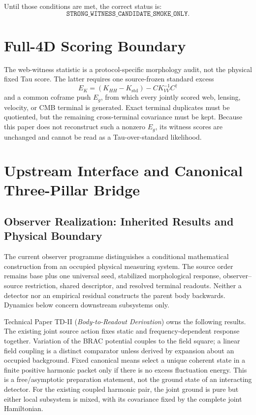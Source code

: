 \documentclass[11pt]{article}
\begin{document}
Until those conditions are met, the correct status is:
\[
\texttt{STRONG\_WITNESS\_CANDIDATE\_SMOKE\_ONLY}.
\]

\section{Full-4D Scoring Boundary}

The web-witness statistic is a protocol-specific morphology audit, not the
physical fixed Tau score.  The latter requires one source-frozen standard
excess
\[
 E_K=(K_{HH}-K_{\mathrm{std}})-CK_{VV}^{-1}C^\dagger
\]
and a common coframe push $E_g$, from which every jointly scored web,
lensing, velocity, or CMB terminal is generated.  Exact terminal duplicates
must be quotiented, but the remaining cross-terminal covariance must be kept.
Because this paper does not reconstruct such a nonzero $E_g$, its witness
scores are unchanged and cannot be read as a Tau-over-standard likelihood.

\section{Upstream Interface and Canonical Three-Pillar Bridge}
\label{sec:upstream-three-pillar-bridge}

\subsection{Observer Realization: Inherited Results and Physical Boundary}
\label{sec:observer-update-20260914}
The current observer programme distinguishes a conditional mathematical
construction from an occupied physical measuring system. The source order
remains base plus one universal seed, stabilized morphological response,
observer--source restriction, shared descriptor, and resolved terminal
readouts. Neither a detector nor an empirical residual constructs the parent
body backwards. Dynamics below concern downstream subsystems only.

Technical Paper TD-II (\emph{Body-to-Readout Derivation}) owns the following
results. The existing joint source action fixes static and frequency-dependent
response together. Variation of the BRAC potential couples to the field
square; a linear field coupling is a distinct comparator unless derived by
expansion about an occupied background. Fixed canonical means select a unique
coherent state in a finite positive harmonic packet only if there is no excess
fluctuation energy. This is a free/asymptotic preparation statement, not the
ground state of an interacting detector. For the existing coupled harmonic
pair, the joint ground is pure but either local subsystem is mixed, with its
covariance fixed by the complete joint Hamiltonian.
\end{document}
